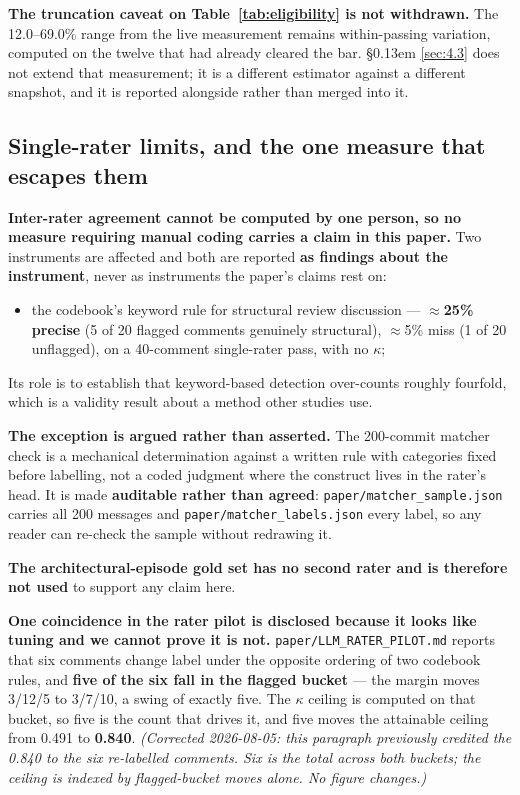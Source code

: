 \documentclass[sigconf,review,anonymous]{acmart}
\begin{document}
\textbf{The truncation caveat on Table~\ref{tab:eligibility} is not withdrawn.} The 12.0--69.0\% range from the live measurement remains within-passing variation, computed on the twelve that had already cleared the bar. \S\kern0.13em \ref{sec:4.3} does not extend that measurement; it is a different estimator against a different snapshot, and it is reported alongside rather than merged into it.

\subsection{Single-rater limits, and the one measure that escapes them}
\label{sec:6.5}

\textbf{Inter-rater agreement cannot be computed by one person, so no measure requiring manual coding carries a claim in this paper.} Two instruments are affected and both are reported \textbf{as findings about the instrument}, never as instruments the paper's claims rest on:

\begin{itemize}
\item the codebook's keyword rule for structural review discussion --- \textbf{$\approx$25\% precise} (5 of 20 flagged comments genuinely structural), $\approx$5\% miss (1 of 20 unflagged), on a 40-comment single-rater pass, with no $\kappa$;
\end{itemize}

Its role is to establish that keyword-based detection over-counts roughly fourfold, which is a validity result about a method other studies use.

\textbf{The exception is argued rather than asserted.} The 200-commit matcher check is a mechanical determination against a written rule with categories fixed before labelling, not a coded judgment where the construct lives in the rater's head. It is made \textbf{auditable rather than agreed}: \texttt{paper/\allowbreak{}matcher\_\allowbreak{}sample.\allowbreak{}json} carries all 200 messages and \texttt{paper/\allowbreak{}matcher\_\allowbreak{}labels.\allowbreak{}json} every label, so any reader can re-check the sample without redrawing it.

\textbf{The architectural-episode gold set has no second rater and is therefore not used} to support any claim here.

\textbf{One coincidence in the rater pilot is disclosed because it looks like tuning and we cannot prove it is not.} \texttt{paper/\allowbreak{}LLM\_\allowbreak{}RATER\_\allowbreak{}PILOT.\allowbreak{}md} reports that six comments change label under the opposite ordering of two codebook rules, and \textbf{five of the six fall in the flagged bucket} --- the margin moves 3/12/5 to 3/7/10, a swing of exactly five. The $\kappa$ ceiling is computed on that bucket, so five is the count that drives it, and five moves the attainable ceiling from 0.491 to \textbf{0.840}. \emph{(Corrected 2026-08-05: this paragraph previously credited the 0.840 to the six re-labelled comments. Six is the total across both buckets; the ceiling is indexed by flagged-bucket moves alone. No figure changes.)}
\end{document}
